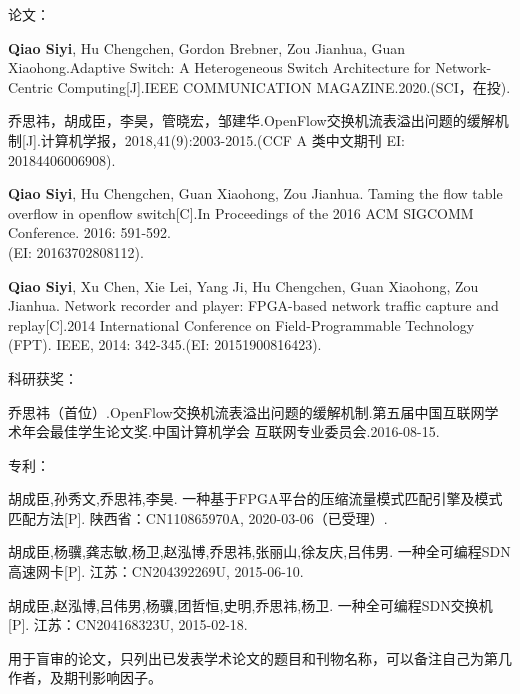 
{}




\noindent 论文：
\begin{publist}
	\item \textbf{Qiao Siyi}, Hu Chengchen, Gordon Brebner, Zou Jianhua, Guan Xiaohong.Adaptive Switch: A Heterogeneous Switch Architecture for Network-Centric Computing[J].IEEE COMMUNICATION MAGAZINE.2020.(SCI，在投).
	\item {\hei 乔思祎}，胡成臣，李昊，管晓宏，邹建华.OpenFlow交换机流表溢出问题的缓解机制[J].计算机学报，2018,41(9):2003-2015.(CCF A 类中文期刊 EI: 20184406006908).
	\item \textbf{Qiao Siyi}, Hu Chengchen, Guan Xiaohong, Zou Jianhua. Taming the flow table overflow in openflow switch[C].In Proceedings of the 2016 ACM SIGCOMM Conference. 2016: 591-592.\\
	(EI: 20163702808112).
	\item \textbf{Qiao Siyi}, Xu Chen, Xie Lei, Yang Ji, Hu Chengchen, Guan Xiaohong, Zou Jianhua. Network recorder and player: FPGA-based network traffic capture and replay[C].2014 International Conference on Field-Programmable Technology (FPT). IEEE, 2014: 342-345.(EI: 20151900816423).
\end{publist}

\noindent 科研获奖：
\begin{publist}
	\item {\hei 乔思祎}（首位）.OpenFlow交换机流表溢出问题的缓解机制.第五届中国互联网学术年会最佳学生论文奖.中国计算机学会 互联网专业委员会.2016-08-15.
\end{publist}

\noindent 专利：
\begin{publist}
	
	\item 胡成臣,孙秀文,{\hei 乔思祎},李昊. 一种基于FPGA平台的压缩流量模式匹配引擎及模式匹配方法[P]. 陕西省：CN110865970A, 2020-03-06（已受理）.
	\item 胡成臣,杨骥,龚志敏,杨卫,赵泓博,{\hei 乔思祎},张丽山,徐友庆,吕伟男. 一种全可编程SDN高速网卡[P]. 江苏：CN204392269U, 2015-06-10. 
	\item 胡成臣,赵泓博,吕伟男,杨骥,团哲恒,史明,{\hei 乔思祎},杨卫. 一种全可编程SDN交换机[P]. 江苏：CN204168323U, 2015-02-18.
\end{publist}






\vspace{\baselineskip}
{\color{red} 用于盲审的论文，只列出已发表学术论文的题目和刊物名称，可以备注自己为第几作者，及期刊影响因子。}

\clearpage{\pagestyle{empty}\cleardoublepage}%
